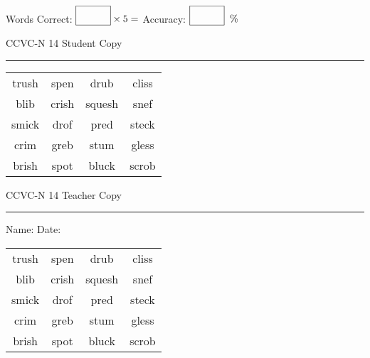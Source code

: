 \documentclass{memoir}
\begin{document}
\small

Words Correct: $\fbox{\phantom{\huge 100}} \times 5 = $ Accuracy: $\fbox{\phantom{\huge 100}}\;\; \%$ 

\vfill

\newpage


\footnotesize \noindent
CCVC-N 14 \hfill Student Copy
\smallskip
\hrule

\Large

\setlength{\tabcolsep}{14pt}
\def\arraystretch{3}

{\selectfont


\begin{vplace}[0.5]
\begin{center}
\begin{tabular}{cccc}
trush & spen & drub             & cliss             \\
blib             & crish & squesh & snef \\
smick & drof & pred & steck \\
crim & greb & stum & gless \\
brish & spot & bluck            & scrob \\
\end{tabular}
\end{center}
\end{vplace}

}

\newpage

\footnotesize \noindent
CCVC-N 14 \hfill Teacher Copy
\smallskip
\hrule

\small

\vfill

\noindent
Name: \underline{\hspace{1.75in}} \hfill Date: \underline{\hspace{1in}}

\Large

{\selectfont


\begin{vplace}[0.5]
\begin{center}
\begin{tabular}{cccc}
trush & spen & drub             & cliss             \\
blib             & crish & squesh & snef \\
smick & drof & pred & steck \\
crim & greb & stum & gless \\
brish & spot & bluck            & scrob \\
\end{tabular}
\end{center}
\end{vplace}



}
\end{document}
